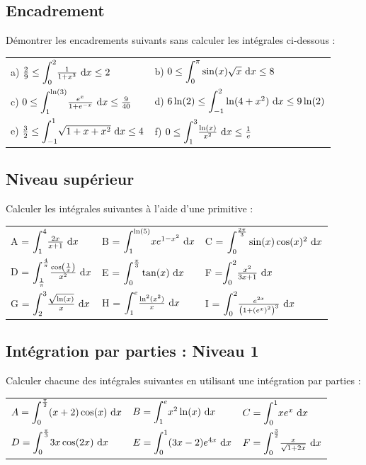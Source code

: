\documentclass[oneside,12pt]{book}          %
\begin{document}
\subsection{Encadrement}
Démontrer les encadrements suivants sans calculer les intégrales ci-dessous :\\
\begin{tabular}{p{} p{}}
        a) $\frac{2}{9}\leq{\displaystyle\int_{0}^{2}}\frac{1}{1+x^3}{\,\,\mathrm{d}} x\leq2$ & b) $0\leq{\displaystyle\int_{0}^{\pi}}\sin(x)\sqrt{x}{\,\,\mathrm{d}} x\leq8$ \\
        c) $0\leq{\displaystyle\int_{1}^{\ln(3)}}\frac{e^x}{1+e^{-x}}{\,\,\mathrm{d}} x\leq\frac{9}{40}$ & d) $6\ln(2)\leq{\displaystyle\int_{-1}^{2}}\ln(4+x^2){\,\,\mathrm{d}} x\leq9\ln(2)$ \\
        e) $\frac{3}{2}\leq{\displaystyle\int_{-1}^{1}}\sqrt{1+x+x^2}{\,\,\mathrm{d}} x\leq4$ & f) $0\leq{\displaystyle\int_{1}^{3}}\frac{\ln(x)}{x^2}{\,\,\mathrm{d}} x\leq\frac{1}{e}$
\end{tabular}



\subsection{Niveau supérieur}
Calculer les intégrales suivantes à l'aide d'une primitive :\\
\renewcommand{\arraystretch}{1.5}
\begin{tabular}{p{} p{} p{}}
    A = ${\displaystyle\int_{1}^{4}}\frac{2x}{x+1}{\,\,\mathrm{d}} x$ & B =  ${\displaystyle\int_{1}^{\ln(5)}}xe^{1-x^2}{\,\,\mathrm{d}} x$  & C = ${\displaystyle\int_{0}^{\frac{2\pi}{3}}}\sin(x)\cos(x)^2{\,\,\mathrm{d}} x$ \\
    D = ${\displaystyle\int_{\frac{1}{\pi}}^{\frac{4}{\pi}}}\frac{\cos\left(\frac{1}{x}\right)}{x^2}{\,\,\mathrm{d}} x$ & E = ${\displaystyle\int_{0}^{\frac{\pi}{3}}}\tan(x){\,\,\mathrm{d}} x$ & F =${\displaystyle\int_{0}^{2}}\frac{x^2}{3x+1}{\,\,\mathrm{d}} x$\\
    G = ${\displaystyle\int_{2}^{3}}\frac{\sqrt{\ln(x)}}{x}{\,\,\mathrm{d}} x$ & H = ${\displaystyle\int_{1}^{e}}\frac{\ln^2(x^2)}{x}{\,\,\mathrm{d}} x$ & I = ${\displaystyle\int_{0}^{2}}\frac{e^{2x}}{\left(1+\left(e^x\right)^2\right)^3}{\,\,\mathrm{d}} x$
\end{tabular}



\subsection{Intégration par parties : Niveau 1}
Calculer chacune des intégrales suivantes en utilisant une intégration par parties :

\begin{tabular}{p{} p{} p{}}
	$A={\displaystyle\int_{0}^{\frac{\pi}{2}}}(x+2)\cos(x){\,\,\mathrm{d}} x$ & $B={\displaystyle\int_{1}^{e}}x^2\ln(x){\,\,\mathrm{d}} x$ & $C={\displaystyle\int_{0}^{1}}xe^x{\,\,\mathrm{d}} x$ \\[5pt]
	$D={\displaystyle\int_{0}^{\frac{\pi}{3}}}3x\cos(2x){\,\,\mathrm{d}} x$ & $E={\displaystyle\int_{0}^{1}}(3x-2)e^{4x}{\,\,\mathrm{d}} x$ & $F={\displaystyle\int_{0}^{\frac{3}{2}}}\frac{x}{\sqrt{1+2x}}{\,\,\mathrm{d}} x$
\end{tabular}
\end{document}
